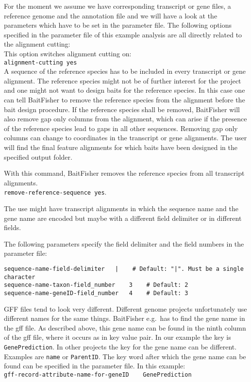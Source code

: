 \documentclass[a4paper,pdflatex,11pt]{article}
\begin{document}
For the moment we assume we have corresponding transcript or gene files, a reference genome and
the annotation file and we will have a look at the parameters which have to be set in the
parameter file. The following options specified in the parameter file of this example analysis 
are all directly related to the alignment cutting:\\

This option switches alignment cutting on:\\
\verb+alignment-cutting yes+\\

A sequence of the reference species has to be included in every transcript or gene alignment.
The reference species might not be of further interest for the project and one might not want
to design baits for the reference species. In this case one can tell BaitFisher
to remove the reference species from the alignment before the bait design procedure.
If the reference species shall be removed, BaitFisher will also remove gap only columns
from the alignment, which can arise if the presence of the reference species lead to gaps in all
other sequences. Removing gap only columns can change to coordinates in the transcript or gene
alignments.
The user will find the final feature alignments for which baits have been designed in the specified
output folder.

With this command, BaitFisher removes the reference species from all transcript alignments.\\
\verb+remove-reference-sequence	yes+.

The use might have transcript alignments in which the sequence name and the gene name are encoded
but maybe with a different field delimiter or in different fields.

The following parameters specify the field delimiter and the field numbers in the parameter file:

\begin{verbatim}
sequence-name-field-delimiter 	|    # Default: "|". Must be a single character
sequence-name-taxon-field_number	3    # Default: 2		
sequence-name-geneID-field_number	4    # Default: 3
\end{verbatim}

GFF files tend to look very different. Different genome projects unfortunately use different names for
the same things. BaitFisher e.g.\ has to find the gene name in the gff file.
As described above, this gene name can be found in the ninth column of the gff file, where it occurs
as in key value pair. In our example the key is \verb+GenePrediction+.
In other projects the key for the gene name can be
different. Examples are \verb+name+ or \verb+ParentID+.
The key word after which the gene name can be found
can be specified in the parameter file. In this example:\\
\verb+gff-record-attribute-name-for-geneID    GenePrediction+\\
\end{document}
